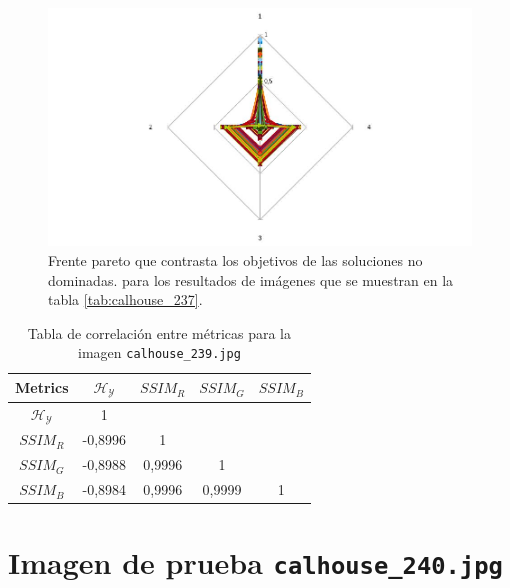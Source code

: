     \begin{figure}[H]
    \centering
    \includegraphics[width=\textwidth]{./Figures/calhouse_237/calhouse_237_2.jpg}
    \caption{Frente pareto que contrasta los objetivos de las soluciones no dominadas. para los resultados de imágenes que se muestran en la tabla \ref{tab:calhouse_237}.}
    \label{fig:calhouse2372fp}
    \end{figure}

\begin{table}[H]
\setlength{\abovecaptionskip}{2pt plus 3pt minus 2pt} %
\caption[Parámetros de entrada para $MOPSO$]{Tabla de correlación entre métricas para la imagen \texttt{calhouse\_239.jpg}}
\begin{center}
 \begin{tabular}{||c | c c c c||} 
 \hline
Metrics & $\mathscr{H_Y}$ & $SSIM_R$ & $SSIM_G$ & $SSIM_B$ \\ 
\hline
$\mathscr{H_Y}$ & 1 &  &  & \\ 
\hline
$SSIM_R$ & -0,8996 & 1 &  \\ 
\hline
$SSIM_G$ & -0,8988 & 0,9996  & 1  & \\ 
\hline
$SSIM_B$ & -0,8984 & 0,9996  & 0,9999  & 1 \\ 
\hline
\end{tabular}
\end{center}
\label{table:correlacion}
\end{table}


\section{Imagen de prueba \texttt{calhouse\_240.jpg}}

